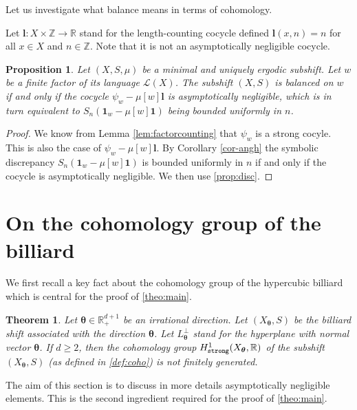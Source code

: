 \documentclass{article}
\newtheorem{theorem}[lemma]{Theorem}
\newtheorem{proposition}[lemma]{Proposition}
\theoremstyle{definition}
\newcommand{\R}{\mathbb{R}}
\newcommand{\btheta}{\boldsymbol{\theta}}
\begin{document}
Let us investigate  what  balance means  in terms of cohomology. 

Let  ${\mathbf l}: X \times \mathbb Z \rightarrow \R$ stand for the length-counting cocycle defined ${\mathbf l} (x,n) = n$ for all  $x \in X$ and $n \in   \mathbb Z $. Note that it is not an asymptotically negligible cocycle.

\begin{proposition}\label{cor-balanced-asympt}
Let $(X,S,\mu)$ be  a minimal  and uniquely ergodic subshift. Let $w$ be a finite factor of its language ${\mathcal L}(X)$.
The subshift   $(X,S)$ is  balanced on $w$ if and only if  the cocycle $\psi_w - \mu[w] \mathbf l$  is asymptotically negligible, which is  in turn equivalent to $S_n({\mathbf 1}_w   -  \mu[w]{\mathbf 1} )$ being bounded uniformly in $n$.

\end{proposition}


\begin{proof}
We know from  Lemma \ref{lem:factorcounting}  that $\psi_w $ is a strong cocyle.  This is also  the case of  $\psi_w  - \mu[w] \mathbf l$.
By Corollary \ref{cor-angh} the symbolic discrepancy $S_n({\mathbf 1}_w   -  \mu[w] {\mathbf 1})$ is bounded uniformly in $n$ if and only if the cocycle is asymptotically negligible.
We then  use \cref{prop:disc}.
 \end{proof}




\section{On the  cohomology group of the billiard}\label{sec:cohobi}


We first  recall a    key fact about the cohomology group of the hypercubic billiard  which is central for the proof of \cref{theo:main}.
\begin{theorem}\cite[Theorem~6.10]{For.Hunt.Kellen.02}\label{prop-jul}
Let $\btheta \in  {\mathbb R}^{d+1}_+$ be an irrational  direction. Let  $(X_{\btheta},S)$    be the billiard  shift associated with the direction $\btheta$.
Let $L_{\btheta}^\perp$ stand for the hyperplane with normal vector $\btheta$.
If  $d\geq 2$,  then the  cohomology group  $H^1_{\tt{strong}}(X_{\btheta},\mathbb R)$   of  the subshift $(X_{\btheta},S)$  (as defined in \cref{def:coho}) is not finitely generated.
\end{theorem}

The aim of  this section is to discuss in more details  asymptotically negligible elements. This is the second ingredient required for the proof of \cref{theo:main}.
\end{document}
